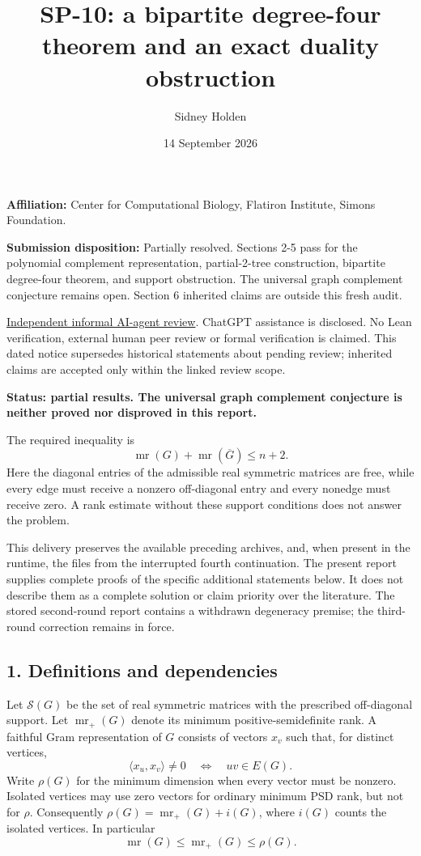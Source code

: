 \documentclass[
  10pt,
]{article}
\title{SP-10: a bipartite degree-four theorem and an exact duality
obstruction}
\author{Sidney Holden}
\date{14 September 2026}
\begin{document}
\maketitle

\textbf{Affiliation:} Center for Computational Biology, Flatiron
Institute, Simons Foundation.

\textbf{Submission disposition:} Partially resolved. Sections 2-5 pass
for the polynomial complement representation, partial-2-tree
construction, bipartite degree-four theorem, and support obstruction.
The universal graph complement conjecture remains open. Section 6
inherited claims are outside this fresh audit.

\href{https://github.com/ajt60gaibb/OpenProblemsInNLA/blob/main/reviews/2026-09-14-further-submissions/SP-10-review.md}{Independent
informal AI-agent review}. ChatGPT assistance is disclosed. No Lean
verification, external human peer review or formal verification is
claimed. This dated notice supersedes historical statements about
pending review; inherited claims are accepted only within the linked
review scope.

\textbf{Status: partial results. The universal graph complement
conjecture is neither proved nor disproved in this report.}

The required inequality is \[
 \operatorname{mr}(G)+\operatorname{mr}(\overline G)\le n+2.
\] Here the diagonal entries of the admissible real symmetric matrices
are free, while every edge must receive a nonzero off-diagonal entry and
every nonedge must receive zero. A rank estimate without these support
conditions does not answer the problem.

This delivery preserves the available preceding archives, and, when
present in the runtime, the files from the interrupted fourth
continuation. The present report supplies complete proofs of the
specific additional statements below. It does not describe them as a
complete solution or claim priority over the literature. The stored
second-round report contains a withdrawn degeneracy premise; the
third-round correction remains in force.

\subsection{1. Definitions and
dependencies}\label{definitions-and-dependencies}

Let \(\mathcal S(G)\) be the set of real symmetric matrices with the
prescribed off-diagonal support. Let \(\operatorname{mr}_+(G)\) denote
its minimum positive-semidefinite rank. A faithful Gram representation
of \(G\) consists of vectors \(x_v\) such that, for distinct vertices,
\[
 \langle x_u,x_v\rangle\ne0\quad\Longleftrightarrow\quad uv\in E(G).
\] Write \(\rho(G)\) for the minimum dimension when every vector must be
nonzero. Isolated vertices may use zero vectors for ordinary minimum PSD
rank, but not for \(\rho\). Consequently
\(\rho(G)=\operatorname{mr}_+(G)+i(G)\), where \(i(G)\) counts the
isolated vertices. In particular \[
 \operatorname{mr}(G)\le\operatorname{mr}_+(G)\le\rho(G).
\]
\end{document}
